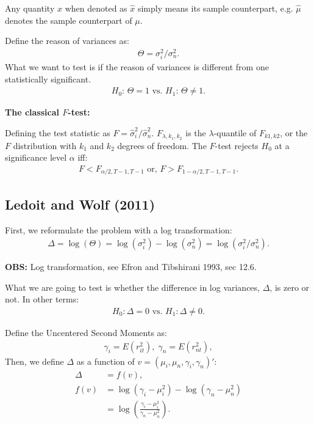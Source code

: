\documentclass[12pt,oneside,a4paper]{article}
\begin{document}
Any quantity $x$ when denoted as $\hat{x}$ simply means its sample counterpart, e.g. $\hat{\mu}$ denotes the sample counterpart of $\mu$.

Define the reason of variances as:
\begin{align}
	\Theta=\sigma^2_{i}/\sigma^2_{n}.
\end{align}
What we want to test is if the reason of variances is different from one statistically significant.
\begin{align*}
	H_{0}: \,\Theta = 1
	\text{ vs. }
	H_{1}: \,\Theta \neq 1.
\end{align*}

\textbf{The classical $F$-test:}

Defining the test statistic as $F=\hat{\sigma}^2_{i}/\hat{\sigma}^2_{n}$.
$F_{\lambda, k_{1}, k_{2}}$ is the $\lambda$-quantile of $F_{k1, k2}$, or the $F$ distribution with $k_{1}$ and $k_{2}$ degrees of freedom.
The $F$-test rejects $H_{0}$ at a significance level $\alpha$ iff:
\begin{align*}
	F < F_{\alpha/2, T-1, T-1} 
	\text{ or, }
	F > F_{1-\alpha/2, T-1, T-1}.
\end{align*}

\subsection{Ledoit and Wolf (2011)}

First, we reformulate the problem with a log transformation: 
\begin{align}
\Delta = \log(\Theta) =
\log(\sigma_{i}^{2}) - \log(\sigma_{n}^{2})  =
\log(\sigma_{i}^{2}/\sigma_{n}^{2}).
\end{align}

\noindent
{\footnotesize
\textbf{OBS:} Log transformation, see Efron and Tibshirani 1993, sec 12.6.}
\vspace{1 em}

What we are going to test is whether the difference in log variances, $\Delta$, is zero or not.
In other terms:
\begin{align*}
	H_{0}: \Delta=0 \text{ vs. } H_{1}: \Delta \neq 0.
\end{align*}

Define the Uncentered Second Moments as:
\begin{align*}
	\gamma_{i} = E(r_{it}^{2}), \; \gamma_{n} = E(r_{nt}^{2}),
\end{align*}
Then, we define $\Delta$ as a function of $v = (\mu_{i}, \mu_{n}, \gamma_{i}, \gamma_{n})'$:
\begin{align*}
\Delta &= f(v),
\\
f(v) &=
\log{(\gamma_{i} - \mu^2_{i})} - \log{(\gamma_{n} - \mu^2_{n})} \\ &=
\log\left( {\frac{\gamma_{i} - \mu^2_{i}}{\gamma_{n} - \mu^2_{n}}} \right).
\end{align*}
\end{document}

